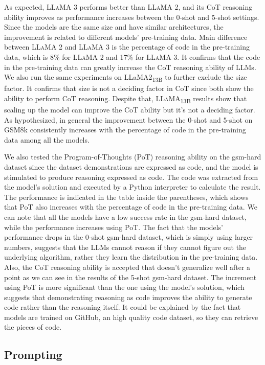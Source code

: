 As expected, \textsc{LLaMA} 3 performs better than \textsc{LLaMA} 2, and its CoT reasoning ability improves as performance increases between the 0-shot and 5-shot settings.
Since the models are the same size and have similar architectures, the improvement is related to different models' pre-training data.
Main difference between \textsc{LLaMA} 2 and \textsc{LLaMA} 3 is the percentage of code in the pre-training data, which is 8\% for \textsc{LLaMA} 2 and 17\% for \textsc{LLaMA} 3.
It confirms that the code in the pre-training data can greatly increase the CoT reasoning ability of LLMs.
We also run the same experiments on LLaMA2\textsubscript{13B} to further exclude the size factor.
It confirms that size is not a deciding factor in CoT since both show the ability to perform CoT reasoning.
Despite that, \textsc{LLaMA}\textsubscript{13B} results show that scaling up the model can improve the CoT ability but it's not a deciding factor.
As hypothesized, in general the improvement between the 0-shot and 5-shot on GSM8k consistently increases with the percentage of code in the pre-training data among all the models.

We also tested the Program-of-Thoughts (PoT) reasoning ability on the gsm-hard dataset since the dataset demonstrations are expressed as code, and the model is stimulated to produce reasoning expressed as code.
The code was extracted from the model's solution and executed by a Python interpreter to calculate the result.
The performance is indicated in the table inside the parentheses, which shows that PoT also increases with the percentage of code in the pre-training data.
We can note that all the models have a low success rate in the gsm-hard dataset, while the performance increases using PoT\@.
The fact that the models' performance drops in the 0-shot gsm-hard dataset, which is simply using larger numbers, suggests that the LLMs cannot reason if they cannot figure out the underlying algorithm, rather they learn the distribution in the pre-training data.
Also, the CoT reasoning ability is accepted that doesn’t generalize well after a point as we can see in the results of the 5-shot gsm-hard dataset.
The increment using PoT is more significant than the one using the model's solution, which suggests that demonstrating reasoning as code improves the ability to generate code rather than the reasoning itself.
It could be explained by the fact that models are trained on GitHub, an high quality code dataset, so they can retrieve the pieces of code.

\subsection{Prompting}
\label{subsec:prompting}

